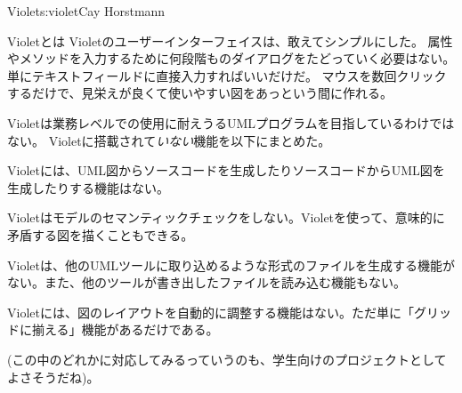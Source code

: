 \begin{aosachapter}{Violet}{s:violet}{Cay Horstmann}
\begin{aosasect1}{Violetとは}
Violetのユーザーインターフェイスは、敢えてシンプルにした。
属性やメソッドを入力するために何段階ものダイアログをたどっていく必要はない。
単にテキストフィールドに直接入力すればいいだけだ。
マウスを数回クリックするだけで、見栄えが良くて使いやすい図をあっという間に作れる。

Violetは業務レベルでの使用に耐えうるUMLプログラムを目指しているわけではない。
Violetに搭載されて\emph{いない}機能を以下にまとめた。

\begin{aosaitemize}

\item Violetには、UML図からソースコードを生成したりソースコードからUML図を生成したりする機能はない。

\item Violetはモデルのセマンティックチェックをしない。Violetを使って、意味的に矛盾する図を描くこともできる。

\item Violetは、他のUMLツールに取り込めるような形式のファイルを生成する機能がない。また、他のツールが書き出したファイルを読み込む機能もない。

\item Violetには、図のレイアウトを自動的に調整する機能はない。ただ単に「グリッドに揃える」機能があるだけである。

\end{aosaitemize}

\noindent
(この中のどれかに対応してみるっていうのも、学生向けのプロジェクトとしてよさそうだね)。


\end{aosasect1}
\end{aosachapter}
